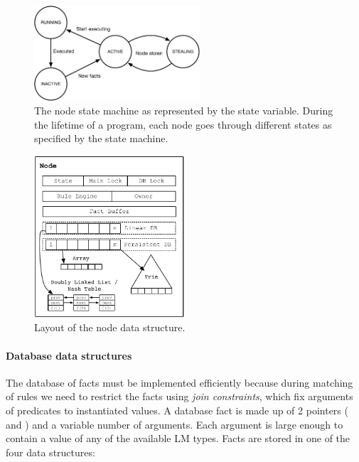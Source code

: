 \begin{figure}[ht]
   \centering
   \includegraphics[width=0.55\textwidth]{figures/local/node_state.pdf}
   \caption{The node state machine as represented by the state variable. During
      the lifetime of a program, each node goes through different states as
      specified by the state machine.}
   \label{fig:local:node_states}
\end{figure}

\begin{figure}[t]
\centering
\includegraphics[width=0.5\textwidth]{figures/local/node.pdf}
\caption{Layout of the node data structure.}
\label{fig:local:node_overview}
\end{figure}

\paragraph{Database data structures}

The database of facts must be implemented efficiently because during matching
of rules we need to restrict the facts using \emph{join constraints}, which fix
arguments of predicates to instantiated values. A database fact is made up of 2
pointers ( and ) and a variable number of arguments.
Each argument is large enough to contain a value of any of the available LM types.
Facts are stored in one of the four data structures:

